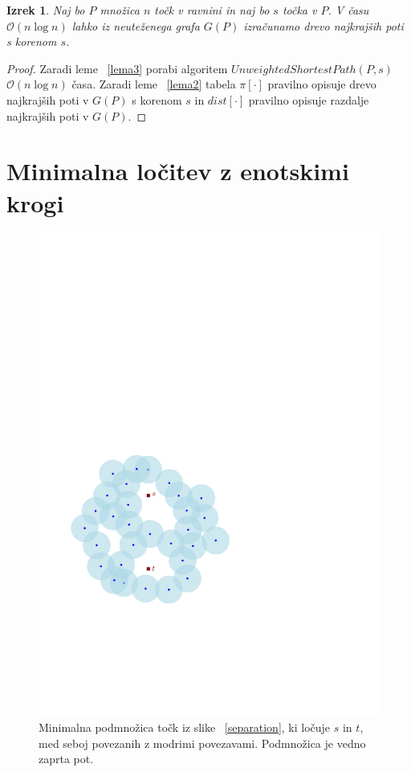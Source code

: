 \documentclass[a4paper, 12pt]{book}
\newcommand{\OO}{\ensuremath{\mathcal{O}}} %
\newtheorem{izrek}{Izrek}[chapter]
\begin{document}
\begin{izrek}
Naj bo $P$ množica $n$ točk v ravnini in naj bo $s$ točka v $P$. V času $\OO(n\log n)$ lahko iz neuteženega grafa $G(P)$ izračunamo drevo najkrajših poti s korenom $s$.
\end{izrek}

\begin{proof}
Zaradi leme ~\ref{lema3} porabi algoritem $UnweightedShortestPath(P,s)$ $\OO(n\log n)$ časa. Zaradi leme ~\ref{lema2} tabela $\pi[\cdot]$ pravilno opisuje drevo najkrajših poti v $G(P)$ s korenom $s$ in $dist[\cdot]$ pravilno opisuje razdalje najkrajših poti v $G(P)$.
\end{proof}
\afterpage{\FloatBarrier}
\section{Minimalna ločitev z enotskimi krogi}

\begin{figure}
\centerline{\includegraphics[scale=0.6,page=3]{pics/separation.pdf}}
\caption{Minimalna podmnožica točk iz slike ~\ref{separation}, ki ločuje $s$ in $t$, med seboj povezanih z modrimi povezavami. Podmnožica je vedno zaprta pot.}
\label{walk}
\end{figure}
\end{document}
